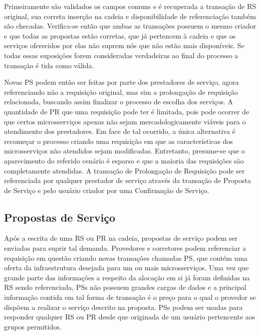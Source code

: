 Primeiramente são validados os campos comuns e é recuperada a transação de \ac{RS} original, sua correta inserção na cadeia e disponibilidade de referenciação também são checadas. Verifica-se então que ambas as transações possuem o mesmo criador e que todas as propostas estão corretas, que já pertencem à cadeia e que os serviços oferecidos por elas não suprem nós que não estão mais disponíveis. Se todas essas suposições forem consideradas verdadeiras ao final do processo a transação é tida como válida.   


%
Novas \ac{PS} podem então ser feitas por parte dos prestadores de serviço, agora referenciando não a requisição original, mas sim a prolongação de requisição relacionada, buscando assim finalizar o processo de escolha dos serviços. A quantidade de \ac{PR} que uma requisição pode ter é limitada, pois pode ocorrer de que certos microsserviços apenas não sejam mercadologicamente viáveis para o atendimento dos prestadores. Em face de tal ocorrido, a única alternativa é recomeçar o processo criando uma requisição em que as características dos microsserviços não atendidos sejam modificadas. Entretanto, presume-se que o aparecimento do referido cenário é esparso e que a maioria das requisições são completamente atendidas. A transação de Prolongação de Requisição pode ser referenciada por qualquer prestador de serviço através da transação de Proposta de Serviço e pelo usuário criador por uma Confirmação de Serviço.

%
\acresetall
\subsection{Propostas de Serviço}
\label{subsec:proposta:contratual:PS}

Após a escrita de uma \ac{RS} ou \ac{PR} na cadeia, propostas de serviço podem ser enviadas para suprir tal demanda. Provedores e corretores podem referenciar a requisição em questão criando novas transações chamadas \ac{PS}, que contém uma oferta da infraestrutura desejada para um ou mais microsserviços. Uma vez que grande parte das informações a respeito da alocação em si já foram definidas na \ac{RS} sendo referenciada, \acp{PS} não possuem grandes cargas de dados e a principal informação contida em tal forma de transação é o preço para o qual o provedor se dispõem a realizar o serviço descrito na proposta. \acp{PS} podem ser usadas para responder qualquer \ac{RS} ou \ac{PR} desde que originada de um usuário pertencente aos grupos permitidos.
%

